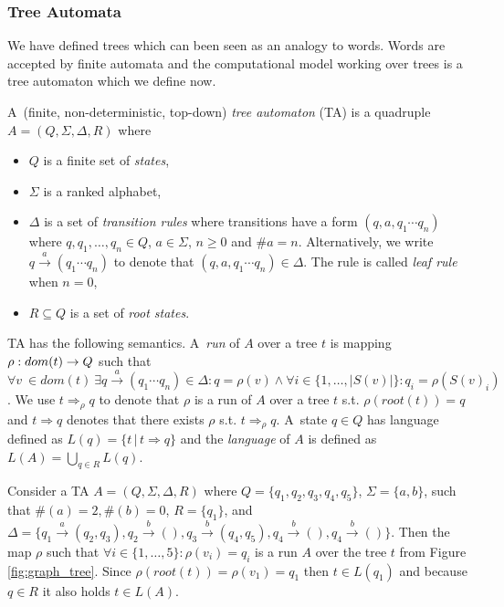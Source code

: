 \documentclass[a4paper, 12pt]{article}
\begin{document}
\subsubsection{Tree Automata}
\label{subsec:ta}

We have defined trees which can been seen as an analogy to words.
Words are accepted by finite automata and the computational model
working over trees is a tree automaton which we define now.

A~(finite, non-deterministic, top-down) \emph{tree automaton} (TA) is a
quadruple $A = (Q, \Sigma, \Delta, R)$ where
\begin{itemize}
	\item $Q$ is a finite set of \emph{states},
	\item $\Sigma$ is a ranked alphabet,
	\item $\Delta$ is a set of \emph{transition rules} where transitions have a form $(q,a,q_1 \cdots q_n)$ where $q,q_1,\ldots,q_n \in Q$, $a \in \Sigma$, $n \geq 0$ and $\#a = n$.
		Alternatively, we write $q \xrightarrow{a} (q_1 \cdots q_n)$ to denote that $(q,a,q_1 \cdots q_n) \in \Delta$.
		The rule is called \emph{leaf rule} when $n=0$,
	\item $R \subseteq Q$ is a set of \emph{root states}.
\end{itemize}

TA has the following semantics.
A~\emph{run} of $A$ over a tree $t$ is mapping $\rho: dom(t) \rightarrow Q$ such that
$\forall v~\in dom(t)\ \exists q \xrightarrow{a} (q_1 \cdots q_n) \in \Delta:  q=\rho(v) \wedge  \forall i \in \{1, \ldots, |S(v)|\}: q_i=\rho(S(v)_i)$.
We use $t \Rightarrow_{\rho} q$ to denote that $\rho$ is a run of $A$
over a tree $t$ s.t. $\rho(root(t)) = q$ and $t \Rightarrow q$ denotes that
there exists $\rho$ s.t. $t \Rightarrow_{\rho} q$. %
A~state $q\in Q$ has language defined as $L(q) = \{t\,|\, t \Rightarrow q\}$
and the \emph{language} of $A$ is defined as $L(A) = \bigcup_{q\in R} L(q)$.

\bexmp
Consider a TA $A=(Q,\Sigma,\Delta, R)$
where $Q=\{q_1,q_2,q_3,q_4,q_5\}$, $\Sigma = \{a,b\}$,
such that $\#(a) = 2, \#(b) =0$, $R=\{q_1\}$,
and $\Delta=\{q_1 \xrightarrow{a} (q_2,q_3), q_2 \xrightarrow{b} (),
q_3 \xrightarrow{b} (q_4,q_5), q_4 \xrightarrow{b} (), q_4 \xrightarrow{b} ()\}$.
Then the map $\rho$ such that $\forall i \in \{1,\ldots,5\}: \rho(v_i) = q_i$
is a run $A$ over the tree $t$ from Figure \ref{fig:graph_tree}.
Since $\rho(root(t)) = \rho(v_1) = q_1$ then $t \in L(q_1)$ and because $q \in R$
it also holds $t \in L(A)$.
\label{ex:ta}
\eexmp
\end{document}
